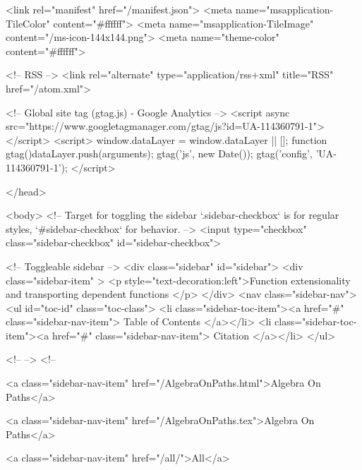   <link rel="manifest" href="/manifest.json">
  <meta name="msapplication-TileColor" content="#ffffff">
  <meta name="msapplication-TileImage" content="/ms-icon-144x144.png">
  <meta name="theme-color" content="#ffffff">
  
  <!-- RSS -->
  <link rel="alternate" type="application/rss+xml" title="RSS" href="/atom.xml">

  <!-- Global site tag (gtag.js) - Google Analytics -->
  <script async src="https://www.googletagmanager.com/gtag/js?id=UA-114360791-1"></script>
  <script>
    window.dataLayer = window.dataLayer || [];
    function gtag(){dataLayer.push(arguments);}
    gtag('js', new Date());
    gtag('config', 'UA-114360791-1');
  </script>

  
</head>




  <body>
    <!-- Target for toggling the sidebar `.sidebar-checkbox` is for regular
     styles, `#sidebar-checkbox` for behavior. -->
<input type="checkbox" class="sidebar-checkbox" id="sidebar-checkbox">

<!-- Toggleable sidebar -->
<div class="sidebar" id="sidebar">
  <div class="sidebar-item" >
    <p style="text-decoration:left">Function extensionality and transporting dependent functions </p>
  </div>
  <nav class="sidebar-nav">
    <ul id="toc-id" class="toc-class">
  <li class="sidebar-toc-item"><a href="#" class="sidebar-nav-item"> Table of Contents </a></li>
  <li class="sidebar-toc-item"><a href="#" class="sidebar-nav-item"> Citation </a></li>
</ul>


    <!--  -->
    <!-- 
      
    
      
    
      
    
      
        
      
    
      
        
          <a class="sidebar-nav-item" href="/AlgebraOnPaths.html">Algebra On Paths</a>
        
      
    
      
        
          <a class="sidebar-nav-item" href="/AlgebraOnPaths.tex">Algebra On Paths</a>
        
      
    
      
        
          <a class="sidebar-nav-item" href="/all/">All</a>
        
      
    
